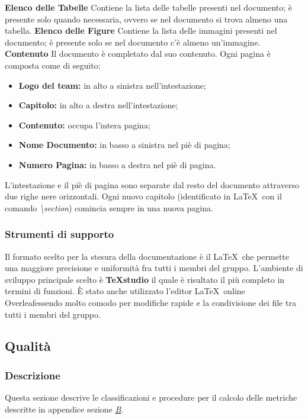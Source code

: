 		\newline \newline \textbf{Elenco delle Tabelle} Contiene la lista delle tabelle presenti nel documento; è presente solo quando necessaria, ovvero se nel documento si trova almeno una tabella.
		\newline \newline \textbf{Elenco delle Figure} Contiene la lista delle immagini presenti nel documento; è presente solo se nel documento c'è almeno un'immagine.
		\newline \newline \textbf{Contenuto}  Il documento è completato dal suo contenuto. Ogni pagina è composta come di seguito:\newline
		\begin{itemize}
			\item \textbf{Logo del team:} in alto a sinistra nell'intestazione;
			\item \textbf{Capitolo:} in alto a destra nell'intestazione;
			\item \textbf{Contenuto:} occupa l'intera pagina;
			\item \textbf{Nome Documento:} in basso a sinistra nel piè di pagina;
			\item \textbf{Numero Pagina:} in basso a destra nel piè di pagina. \newline
		\end{itemize}
		L'intestazione e il piè di pagina sono separate dal resto del documento attraverso due righe nere orizzontali. Ogni nuovo capitolo (identificato in \LaTeX ~con il comando \textit{\textbackslash{}section}) comincia sempre in una nuova pagina.
		\subsubsection{Strumenti di supporto}
		\label{3.1.8}
			Il formato scelto per la stesura della documentazione è il  \LaTeX\pedice ~che permette una maggiore precisione e uniformità fra tutti i membri del gruppo. L'ambiente di sviluppo principale scelto è \textbf{TeXstudio\pedice} il quale è risultato il più completo in termini di funzioni.
			È stato anche utilizzato l'editor \LaTeX ~online Overleaf\pedice essendo molto comodo per modifiche rapide e la condivisione dei file tra tutti i membri del gruppo.
	\subsection{Qualità}
\subsubsection{Descrizione}
    Questa sezione descrive le classificazioni e procedure per il calcolo delle metriche descritte in appendice sezione \hyperref[B]{\textit{\underline{B}}}.
